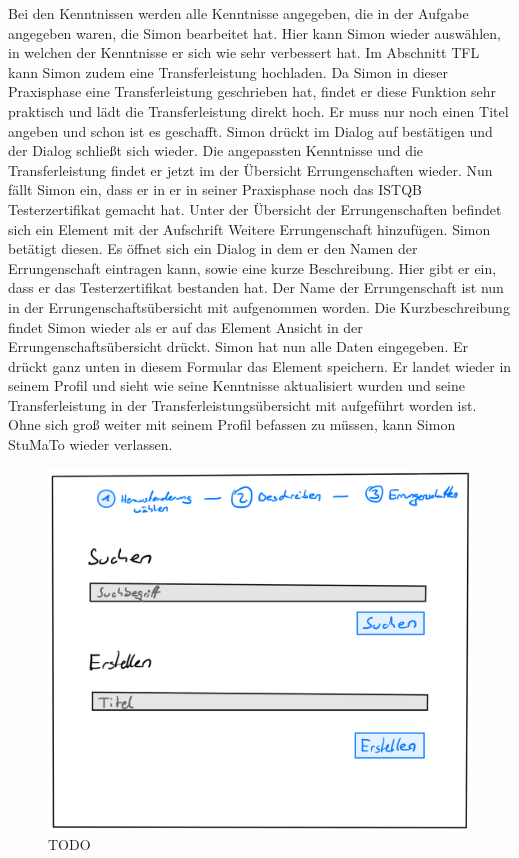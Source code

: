 \documentclass[
  12pt,
  ngerman,
  a4paper,
]{article}
\begin{document}
Bei den Kenntnissen werden alle Kenntnisse angegeben, die in der Aufgabe
angegeben waren, die Simon bearbeitet hat. Hier kann Simon wieder
auswählen, in welchen der Kenntnisse er sich wie sehr verbessert hat. Im
Abschnitt TFL kann Simon zudem eine Transferleistung hochladen. Da Simon
in dieser Praxisphase eine Transferleistung geschrieben hat, findet er
diese Funktion sehr praktisch und lädt die Transferleistung direkt hoch.
Er muss nur noch einen Titel angeben und schon ist es geschafft. Simon
drückt im Dialog auf bestätigen und der Dialog schließt sich wieder. Die
angepassten Kenntnisse und die Transferleistung findet er jetzt im der
Übersicht Errungenschaften wieder. Nun fällt Simon ein, dass er in er in
seiner Praxisphase noch das ISTQB Testerzertifikat gemacht hat. Unter
der Übersicht der Errungenschaften befindet sich ein Element mit der
Aufschrift Weitere Errungenschaft hinzufügen. Simon betätigt diesen. Es
öffnet sich ein Dialog in dem er den Namen der Errungenschaft eintragen
kann, sowie eine kurze Beschreibung. Hier gibt er ein, dass er das
Testerzertifikat bestanden hat. Der Name der Errungenschaft ist nun in
der Errungenschaftsübersicht mit aufgenommen worden. Die
Kurzbeschreibung findet Simon wieder als er auf das Element Ansicht in
der Errungenschaftsübersicht drückt. Simon hat nun alle Daten
eingegeben. Er drückt ganz unten in diesem Formular das Element
speichern. Er landet wieder in seinem Profil und sieht wie seine
Kenntnisse aktualisiert wurden und seine Transferleistung in der
Transferleistungsübersicht mit aufgeführt worden ist. Ohne sich groß
weiter mit seinem Profil befassen zu müssen, kann Simon StuMaTo wieder
verlassen.

\begin{figure}
\centering
\includegraphics{./tex2pdf.-930e6666e1221838/fa35374883bb353f9c5c297b9ba2883027683598.jpg}
\caption{TODO}
\end{figure}
\end{document}
